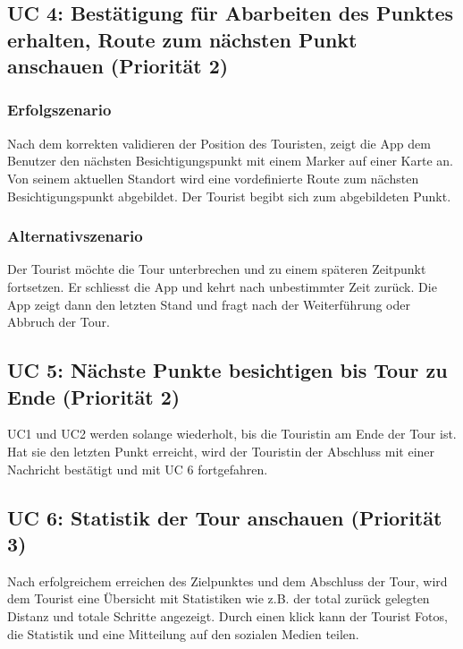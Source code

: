 \documentclass[a4paper,10pt,xetex]{article}
\begin{document}
\subsection{UC 4: Bestätigung für Abarbeiten des Punktes erhalten, Route zum nächsten Punkt anschauen (Priorität 2)}\label{uc-4-user-bekommt-bestuxe4tigung-fuxfcr-das-abarbeiten-des-punktes-die-route-zum-nuxe4chsten-punkt-wird-angezeigt.-priorituxe4t-2}
\subsubsection{Erfolgszenario}\label{erfolgszenario-2}
Nach dem korrekten validieren der Position des Touristen, zeigt die App
dem Benutzer den nächsten Besichtigungspunkt mit einem Marker auf einer
Karte an. Von seinem aktuellen Standort wird eine vordefinierte Route
zum nächsten Besichtigungspunkt abgebildet. Der Tourist begibt sich zum
abgebildeten Punkt.


\subsubsection{Alternativszenario}\label{alternativszenario-1}
Der Tourist möchte die Tour unterbrechen und zu einem späteren
Zeitpunkt fortsetzen. Er schliesst die App und kehrt nach unbestimmter
Zeit zurück. Die App zeigt dann den letzten Stand und fragt nach der
Weiterführung oder Abbruch der Tour.


\subsection{UC 5: Nächste Punkte besichtigen bis Tour zu Ende (Priorität 2)}\label{uc-5-user-besucht-nuxe4chste-punkte-bis-tour-zu-ende.-priorituxe4t-2}
UC1 und UC2 werden solange wiederholt, bis die Touristin am Ende der Tour
ist. Hat sie den letzten Punkt erreicht, wird der Touristin der Abschluss
mit einer Nachricht bestätigt und mit UC 6 fortgefahren.


\subsection{UC 6: Statistik der Tour anschauen (Priorität 3)}\label{uc-6-user-sieht-statistik-der-tour.-priorituxe4t-3}
Nach erfolgreichem erreichen des Zielpunktes und dem Abschluss der Tour,
wird dem Tourist eine Übersicht mit Statistiken wie z.B. der total
zurück gelegten Distanz und totale Schritte angezeigt. Durch einen klick
kann der Tourist Fotos, die Statistik und eine Mitteilung auf den
sozialen Medien teilen.
\end{document}
